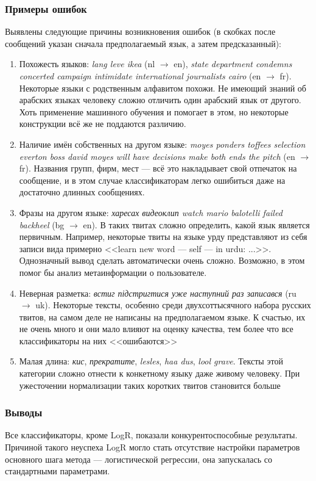 \documentclass[a4paper, 14pt]{article}
\begin{document}
		\subsubsection{Примеры ошибок}
		Выявлены следующие причины возникновения ошибок (в скобках после сообщений указан сначала предполагаемый язык, а затем предсказанный):
		\begin{enumerate}
			\item Похожесть языков: \textit{lang leve ikea} (nl $\to$ en), 
				\textit{state department condemns concerted campaign intimidate international journalists cairo} (en $\to$ fr).
				Некоторые языки с родственным алфавитом похожи. Не имеющий знаний об арабских языках
				 человеку сложно отличить один арабский язык от другого. Хоть применение
				машинного обучения и помогает в этом, но некоторые конструкции всё же не поддаются различию.
			\item Наличие имён собственных на другом языке:
				\textit{moyes ponders toffees selection everton boss david moyes will have decisions make both ends the pitch} (en $\to$ fr).
				Названия групп, фирм, мест --- всё это накладывает свой отпечаток на сообщение, и в этом случае классификаторам
				легко ошибиться даже на достаточно длинных сообщениях.
			\item Фразы на другом языке:
				\textit{харесах видеоклип watch mario balotelli failed backheel} (bg $\to$ en). В таких твитах сложно определить, какой
				язык является первичным. Например, некоторые твиты на языке урду представляют из себя записи вида примерно 
				<<learn new word --- self --- in urdu: ...>>. Однозначный вывод сделать автоматически очень сложно. Возможно, в этом
				помог бы анализ метаинформации о пользователе.
			\item Неверная разметка: 
				\textit{встиг підстригтися уже наступний раз записався} (ru $\to$ uk). Некоторые тексты, особенно среди двухсоттысячного набора 
				русских твитов, на самом деле не написаны на предполагаемом языке. К счастью, их не очень много и они мало влияют на оценку
				качества, тем более что все классификаторы на них <<ошибаются>>
			\item Малая длина:
				\textit{кис}, \textit{прекратите}, \textit{lesles}, \textit{haa dus}, \textit{lool grave}. Тексты этой категории сложно отнести
				к конкетному языку даже живому человеку. При ужесточении нормализации таких коротких твитов становится больше
		\end{enumerate}
	
		\subsubsection{Выводы}
		Все классификаторы, кроме LogR, показали конкурентоспособные результаты. Причиной такого неуспеха LogR могло стать отсутствие настройки параметров основного шага метода --- логистической регрессии, она запускалась со стандартными параметрами.
		
\end{document}
